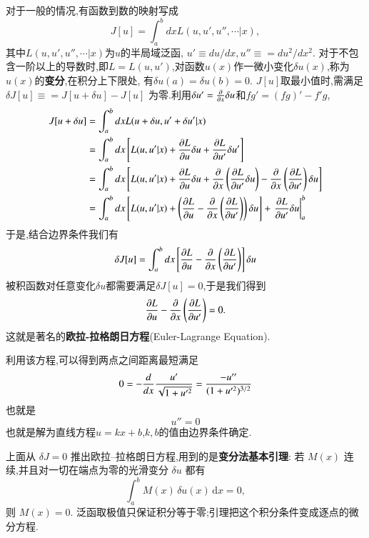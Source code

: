 对于一般的情况,有函数到数的映射写成
\begin{equation}
  J[u] = \int_{a}^{b}  dx L(u, u', u'', \cdots| x), 
\end{equation}
其中$L(u, u', u'',\cdots | x)$为$u$的半局域泛函, $u' \equiv du/dx, u'' \equiv = du^2/dx^2$.
对于不包含一阶以上的导数时,即$L = L(u,u')$,对函数$u(x)$作一微小变化$\delta u(x)$,称为$u(x)$的\textbf{变分},在积分上下限处,
有$\delta u(a) = \delta u(b) = 0$. $J[u]$取最小值时,需满足$\delta J[u] \equiv = J[u + \delta u] - J[u]$
为零.利用$\delta u' = \frac{\partial{}}{\partial{x}} \delta u$和$fg' = (fg)' - f'g$,
\begin{align}
  J[u + \delta u] &= \int_{a}^{b}  dx L(u + \delta u, u' + \delta u'| x) 
    \nonumber \\ 
    &= \int_{a}^{b} dx \left[ L(u, u'| x) + \funcpd{L}{u} \delta u + \funcpd{L}{u'} \delta u' \right]  
    \nonumber \\ 
    &= \int_{a}^{b} dx \left[ L(u, u'| x) + \funcpd{L}{u} \delta u + \funcpd{}{x}\left( \funcpd{L}{u'} \delta u \right)
    -  \funcpd{}{x}\left( \funcpd{L}{u'} \right) \delta u  \right]  
    \nonumber \\ 
    &= \int_{a}^{b} dx \left[ L(u, u'| x) + \left( \funcpd{L}{u} -  \funcpd{}{x}\left( \funcpd{L}{u'} \right)   \right) \delta u \right]  
        + \left. \funcpd{L}{u'} \delta u \right|_{a}^{b} 
     \nonumber %
\end{align}
于是,结合边界条件我们有
\begin{align}
  \delta J[u] = \int_{a}^{b} dx \left[ \frac{\partial{L}}{\partial{u}} -  \frac{\partial{}}{\partial{x}}\left( \frac{\partial{L}}{\partial{u'}} \right)   \right] \delta u 
\end{align}
被积函数对任意变化$\delta u$都需要满足$\delta J[u] = 0$,于是我们得到
\begin{equation}
  \frac{\partial{L}}{\partial{u}} -  \frac{\partial{}}{\partial{x}}\left( \frac{\partial{L}}{\partial{u'}} \right) = 0 .
\end{equation}
这就是著名的\textbf{欧拉-拉格朗日方程}(Euler-Lagrange Equation).

利用该方程,可以得到两点之间距离最短满足
$$
  0 = - \frac{d{}}{d{x}} \frac{u'}{\sqrt{1 + u'^2}} = \frac{-u''}{(1+ u'^2)^{3/2}}
$$
也就是
$$ u'' = 0$$
也就是解为直线方程$ u = k x + b$,$k,b$的值由边界条件确定.

上面从 $\delta J=0$ 推出欧拉--拉格朗日方程,用到的是\textbf{变分法基本引理}:
若 $M(x)$ 连续,并且对一切在端点为零的光滑变分 $\delta u$ 都有
\begin{equation}
  \int_a^b M(x)\,\delta u(x)\,\mathrm{d}x = 0,
\end{equation}
则 $M(x)=0$. 泛函取极值只保证积分等于零;引理把这个积分条件变成逐点的微分方程.

